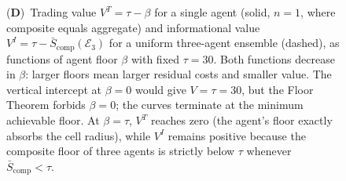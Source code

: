 \begin{figure}[!htbp]
{    (\textbf{D})~Trading value $V^T = \tau - \beta$ for a single agent (solid, $n = 1$, where composite equals aggregate) and informational value $V^I = \tau - \bar{S}_{\mathrm{comp}}(\mathcal{E}_3)$ for a uniform three-agent ensemble (dashed), as functions of agent floor $\beta$ with fixed $\tau = 30$.  Both functions decrease in $\beta$: larger floors mean larger residual costs and smaller value.  The vertical intercept at $\beta = 0$ would give $V = \tau = 30$, but the Floor Theorem forbids $\beta = 0$; the curves terminate at the minimum achievable floor.  At $\beta = \tau$, $V^T$ reaches zero (the agent's floor exactly absorbs the cell radius), while $V^I$ remains positive because the composite floor of three agents is strictly below $\tau$ whenever $\bar{S}_{\mathrm{comp}} < \tau$.}
    \label{fig:price_panel_1}
\end{figure}

